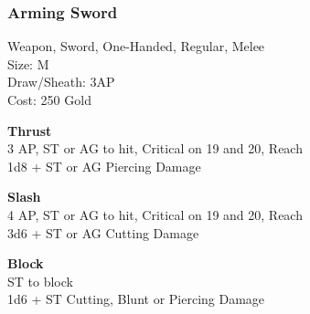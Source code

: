 \subsubsection{Arming Sword}\label{weapon:armingSword}
Weapon, Sword, One-Handed, Regular, Melee\\
Size: M\\
Draw/Sheath: 3AP\\
Cost: 250 Gold

\textbf{Thrust}\\
3 AP, ST or AG to hit, Critical on 19 and 20,  Reach\\
1d8 + \texttimes ST or AG Piercing Damage

\textbf{Slash}\\
4 AP, ST or AG to hit, Critical on 19 and 20,  Reach\\
3d6 + \texttimes ST or AG Cutting Damage

\textbf{Block}\\
ST to block\\
1d6 + \texttimes ST Cutting, Blunt or Piercing Damage